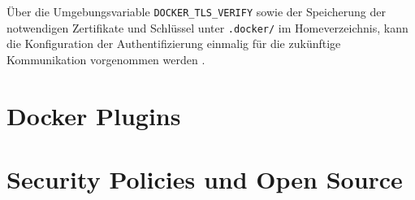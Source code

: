 \documentclass[../main.tex]{subfiles}
\begin{document}
    Über die Umgebungsvariable \texttt{DOCKER\_TLS\_VERIFY} sowie der Speicherung der notwendigen Zertifikate und Schlüssel unter \texttt{.docker/} im Homeverzeichnis, kann die Konfiguration der Authentifizierung einmalig für die zukünftige Kommunikation vorgenommen werden \cite{https://docs.docker.com/engine/security/https/}.




  \section{Docker Plugins}


  \section{Security Policies und Open Source}


\end{document}

